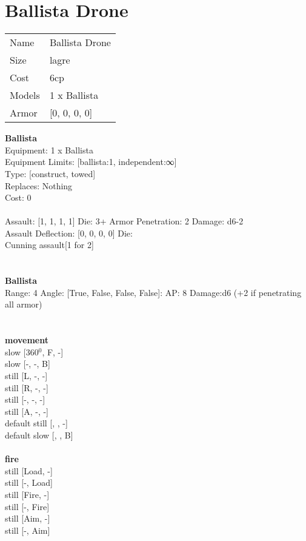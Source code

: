 \pagebreak\pagebreak

\section{ Ballista Drone }

\begin{tabular}{ll}
  Name & Ballista Drone \\
  Size & lagre\\
  Cost & 6cp\\
  Models & 1 x Ballista\\
  Armor & [0, 0, 0, 0]\\
\end{tabular}

\noindent 

{\bf Ballista } \\
Equipment: 1 x Ballista \\
Equipment Limits: [ballista:1, independent:∞] \\
Type: [construct, towed] \\
Replaces: Nothing \\
Cost: 0\\
\ \\
Assault: [1, 1, 1, 1] Die: 3+ Armor Penetration: 2 Damage: d6-2 \\
Assault Deflection: [0, 0, 0, 0] Die: \\
\indent Cunning assault[1 for 2]\\ 
 
\ \\

\ \\
{\bf Ballista } \\



Range: 4  Angle: [True, False, False, False]: AP: 8 Damage:d6 (+2 if penetrating all armor) \\




 
\ \\



\ \\ {\bf movement } \\
slow [360$^0$, F, -] \\
slow [-, -, B] \\
still [L, -, -] \\
still [R, -, -] \\
still [-, -, -] \\
still [A, -, -] \\
default still [, , -] \\
default slow [, , B] \\
\ \\ {\bf fire } \\
still [Load, -] \\
still [-, Load] \\
still [Fire, -] \\
still [-, Fire] \\
still [Aim, -] \\
still [-, Aim] \\


